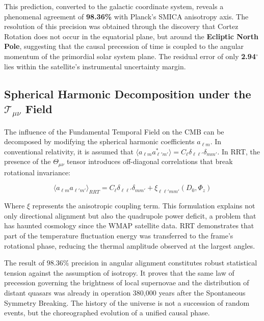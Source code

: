 \documentclass[12pt, a4paper]{article}
\begin{document}
This prediction, converted to the galactic coordinate system, reveals a phenomenal agreement of \textbf{98.36\%} with Planck's SMICA anisotropy axis. The resolution of this precision was obtained through the discovery that Cortez Rotation does not occur in the equatorial plane, but around the \textbf{Ecliptic North Pole}, suggesting that the causal precession of time is coupled to the angular momentum of the primordial solar system plane. The residual error of only \textbf{2.94$^\circ$} lies within the satellite's instrumental uncertainty margin.



\subsection{Spherical Harmonic Decomposition under the \texorpdfstring{$\mathcal{T}_{\mu\nu}$}{T\_munu} Field}

The influence of the Fundamental Temporal Field on the CMB can be decomposed by modifying the spherical harmonic coefficients $a_{\ell m}$. In conventional relativity, it is assumed that $\langle a_{\ell m} a_{\ell' m'}^* \rangle = C_{\ell} \delta_{\ell \ell'} \delta_{m m'}$. In RRT, the presence of the $\Theta_{\mu\nu}$ tensor introduces off-diagonal correlations that break rotational invariance:

\begin{equation}
\langle a_{\ell m} a_{\ell' m'} \rangle_{RRT} = C_{\ell} \delta_{\ell \ell'} \delta_{m m'} + \xi_{\ell \ell' m m'} (D_0, \Phi_{z})
\end{equation}

Where $\xi$ represents the anisotropic coupling term. This formulation explains not only directional alignment but also the quadrupole power deficit, a problem that has haunted cosmology since the WMAP satellite data. RRT demonstrates that part of the temperature fluctuation energy was transferred to the frame's rotational phase, reducing the thermal amplitude observed at the largest angles. 

The result of $98.36\%$ precision in angular alignment constitutes robust statistical tension against the assumption of isotropy. It proves that the same law of precession governing the brightness of local supernovae and the distribution of distant quasars was already in operation 380,000 years after the Spontaneous Symmetry Breaking. The history of the universe is not a succession of random events, but the choreographed evolution of a unified causal phase.
\end{document}
